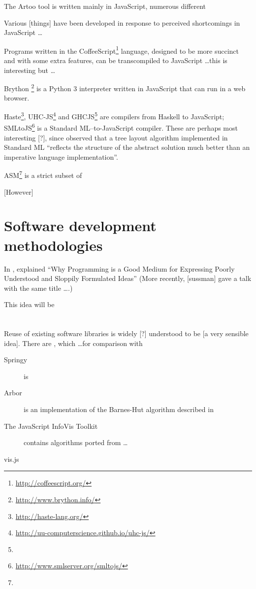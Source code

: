 The Artoo tool is written mainly in JavaScript, numerous different 

Various [things] have been developed in response to perceived shortcomings in JavaScript \ldots

Programs written in the CoffeeScript\footnote{\url{http://coffeescript.org/}} language, designed to be more succinct and with some extra features, can be transcompiled to JavaScript \ldots this is interesting but \ldots

Brython \footnote{\url{http://www.brython.info/}} is a Python 3 interpreter written in JavaScript that can run in a web browser. 

Haste\footnote{\url{http://haste-lang.org/}}, UHC-JS\footnote{\url{http://uu-computerscience.github.io/uhc-js/}} and GHCJS\footnote{} are compilers from Haskell to JavaScript; SMLtoJS\footnote{\url{http://www.smlserver.org/smltojs/}} is a Standard ML--to-JavaScript compiler. These are perhaps most interesting [?], since \citet{kennedyfuntrees} observed that a tree layout algorithm implemented in Standard ML ``reflects the structure of the abstract solution much better than an imperative language implementation''.



ASM\footnote{} is a strict subset of 

[However]


\section{Software development methodologies}

In \citeyear{67poorslop}, \citet*{67poorslop} explained ``Why Programming is a Good Medium for Expressing Poorly Understood and Sloppily Formulated Ideas''
(More recently, [sussman] gave a talk with the same title \ldots {}.)

This idea will be 

\section{}

Reuse of existing software libraries is widely [?] understood to be [a very sensible idea]. There are , which \ldots for comparison with 

\begin{description}
  \item[Springy] is 
  \item[Arbor] is an implementation of the Barnes-Hut algorithm described in  
  \item[The JavaScript InfoVis Toolkit] contains algorithms ported from \ldots
  \item[vis.js]
\end{description}

